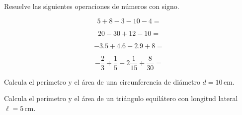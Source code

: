 \documentclass[11pt]{article}
\begin{document}
\vspace{1cm}
Resuelve las siguientes operaciones de n\'umeros con signo.

\vspace{-5mm}
\begin{multicols}{2}

\begin{equation}
5 + 8 - 3 - 10 - 4 =
\end{equation}

\vspace{1cm}

\begin{equation}
20 -30 +12 -10 =
\end{equation}

\vspace{1cm}

\end{multicols}

\newpage

\begin{multicols}{2}

\begin{equation}
-3.5 + 4.6 - 2.9 + 8 = 
\end{equation}

\vspace{1cm}

\begin{equation}
-\frac{2}{3} + \frac{1}{5} -2 \frac{1}{15} + \frac{8}{30} =
\end{equation}

\vspace{1cm}
\end{multicols}

\vspace{5cm}
Calcula el per\'imetro y el \'area de una circunferencia de di\'ametro
$d=10$\,cm.

\vspace{7cm}
Calcula el per\'imetro y el \'area de un tri\'angulo equil\'atero con longitud 
lateral $\ell= 5$\,cm.
\end{document}
